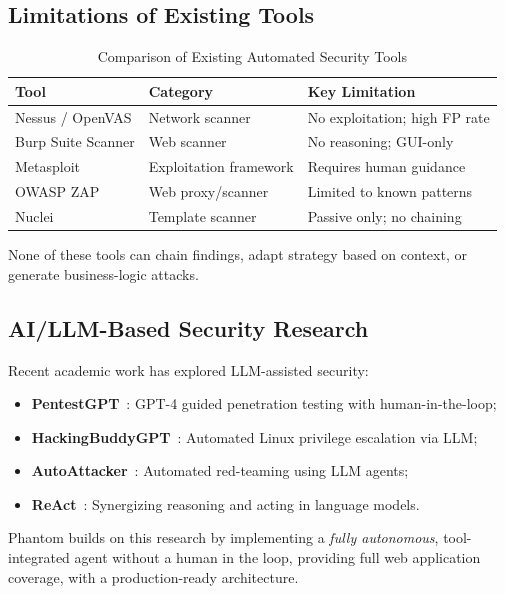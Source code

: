 \documentclass[12pt,a4paper]{article}
\begin{document}
\subsection{Limitations of Existing Tools}

\begin{table}[H]
\centering
\caption{Comparison of Existing Automated Security Tools}
\begin{tabular}{lll}
\toprule
\textbf{Tool} & \textbf{Category} & \textbf{Key Limitation} \\
\midrule
Nessus / OpenVAS & Network scanner & No exploitation; high FP rate \\
Burp Suite Scanner & Web scanner & No reasoning; GUI-only \\
Metasploit & Exploitation framework & Requires human guidance \\
OWASP ZAP & Web proxy/scanner & Limited to known patterns \\
Nuclei & Template scanner & Passive only; no chaining \\
\bottomrule
\end{tabular}
\end{table}

None of these tools can chain findings, adapt strategy based on context, or generate business-logic attacks.

\subsection{AI/LLM-Based Security Research}

Recent academic work has explored LLM-assisted security:

\begin{itemize}
  \item \textbf{PentestGPT}~\cite{pentestgpt2023}: GPT-4 guided penetration testing with human-in-the-loop;
  \item \textbf{HackingBuddyGPT}~\cite{hackingbuddy2023}: Automated Linux privilege escalation via LLM;
  \item \textbf{AutoAttacker}~\cite{autoattacker2024}: Automated red-teaming using LLM agents;
  \item \textbf{ReAct}~\cite{react2023}: Synergizing reasoning and acting in language models.
\end{itemize}

Phantom builds on this research by implementing a \emph{fully autonomous}, tool-integrated agent without a human in the loop, providing full web application coverage, with a production-ready architecture.
\end{document}
